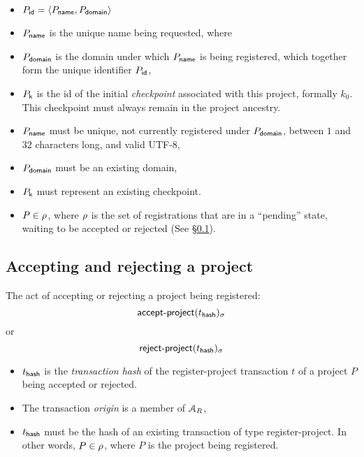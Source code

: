 \begin{itemize}
    \item $P_{\mathsf{id}} = \langle P_{\mathsf{name}}, P_{\mathsf{domain}}\rangle$
    \item $P_{\mathsf{name}}$ is the unique name being requested, where
    \item $P_{\mathsf{domain}}$ is the domain under which $P_{\mathsf{name}}$ is
        being registered, which together form the unique identifier
        $P_{\mathsf{id}}$,
    \item $P_{\mathsf{k}}$ is the id of the initial \emph{checkpoint} associated
        with this project, formally $k_0$. This checkpoint must always remain
        in the project ancestry.
\end{itemize}
\validation
\begin{itemize}
    \item $P_{\mathsf{name}}$ must be unique, \ie not currently registered under
        $P_{\mathsf{domain}}$, between $1$ and $32$ characters long, and valid
        \textsf{UTF-8},
    \item $P_{\mathsf{domain}}$ must be an existing domain,
    \item $P_{\mathsf{k}}$ must represent an existing checkpoint.
\end{itemize}
\outputs
\begin{itemize}
    \item $P \in \mathcal{\rho}$, where $\mathcal{\rho}$ is the set of registrations that
        are in a ``pending'' state, waiting to be accepted or rejected (See
        \S\ref{s:accepting-projects}).
\end{itemize}

\subsection{Accepting and rejecting a project}
\label{s:accepting-projects}
The act of accepting or rejecting a project being registered:
\[
    \operatorname{\mathsf{accept-project}}\lparen t_{\mathsf{hash}}\rparen_\sigma
\]
or
\[
    \operatorname{\mathsf{reject-project}}\lparen t_{\mathsf{hash}}\rparen_\sigma
\]

\begin{itemize}
    \item $t_{\mathsf{hash}}$ is the \emph{transaction hash} of the
        \textsf{register-project} transaction $t$ of a project $P$
        being accepted or rejected.
\end{itemize}
\validation
\begin{itemize}
    \item The transaction \emph{origin} is a member of $\mathcal{A}_R$,
    \item $t_{\mathsf{hash}}$ must be the hash of an existing transaction of
        type \textsf{register-project}. In other words, $P \in \mathcal{\rho}$,
        where $P$ is the project being registered.
\end{itemize}

